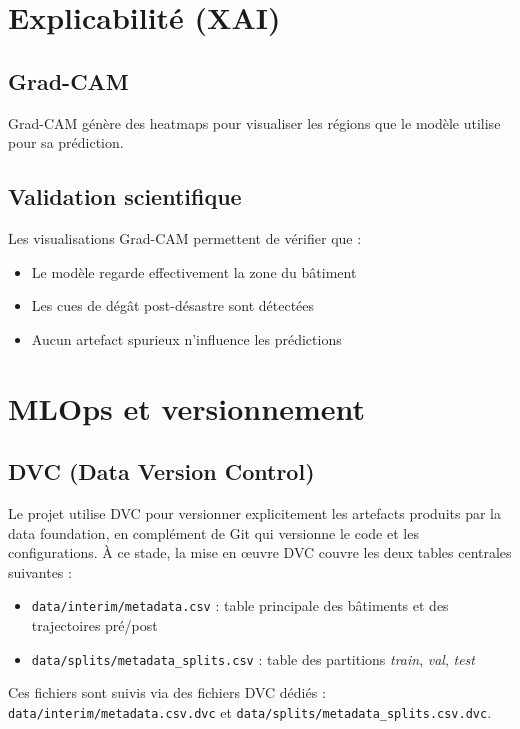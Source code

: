 \documentclass[12pt,a4paper]{article}
\begin{document}
\newpage

\section{Explicabilité (XAI)}

\subsection{Grad-CAM}
Grad-CAM génère des heatmaps pour visualiser les régions que le modèle utilise pour sa prédiction.

\subsection{Validation scientifique}
Les visualisations Grad-CAM permettent de vérifier que :
\begin{itemize}
    \item Le modèle regarde effectivement la zone du bâtiment
    \item Les cues de dégât post-désastre sont détectées
    \item Aucun artefact spurieux n'influence les prédictions
\end{itemize}

\newpage

\section{MLOps et versionnement}

\subsection{DVC (Data Version Control)}
Le projet utilise DVC pour versionner explicitement les artefacts produits par la data foundation, en complément de Git qui versionne le code et les configurations. À ce stade, la mise en œuvre DVC couvre les deux tables centrales suivantes :
\begin{itemize}
    \item \texttt{data/interim/metadata.csv} : table principale des bâtiments et des trajectoires pré/post
    \item \texttt{data/splits/metadata\_splits.csv} : table des partitions \textit{train}, \textit{val}, \textit{test}
\end{itemize}
Ces fichiers sont suivis via des fichiers DVC dédiés : \texttt{data/interim/metadata.csv.dvc} et \texttt{data/splits/metadata\_splits.csv.dvc}.
\end{document}
